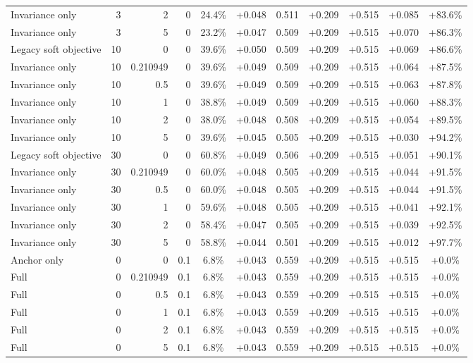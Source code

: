 \begin{table}[htbp]
\begin{tabular}{lrrrccccccc}
Invariance only & 3 & 2 & 0 & 24.4\% & +0.048 & 0.511 & +0.209 & +0.515 & +0.085 & +83.6\% \\
Invariance only & 3 & 5 & 0 & 23.2\% & +0.047 & 0.509 & +0.209 & +0.515 & +0.070 & +86.3\% \\
Legacy soft objective & 10 & 0 & 0 & 39.6\% & +0.050 & 0.509 & +0.209 & +0.515 & +0.069 & +86.6\% \\
Invariance only & 10 & 0.210949 & 0 & 39.6\% & +0.049 & 0.509 & +0.209 & +0.515 & +0.064 & +87.5\% \\
Invariance only & 10 & 0.5 & 0 & 39.6\% & +0.049 & 0.509 & +0.209 & +0.515 & +0.063 & +87.8\% \\
Invariance only & 10 & 1 & 0 & 38.8\% & +0.049 & 0.509 & +0.209 & +0.515 & +0.060 & +88.3\% \\
Invariance only & 10 & 2 & 0 & 38.0\% & +0.048 & 0.508 & +0.209 & +0.515 & +0.054 & +89.5\% \\
Invariance only & 10 & 5 & 0 & 39.6\% & +0.045 & 0.505 & +0.209 & +0.515 & +0.030 & +94.2\% \\
Legacy soft objective & 30 & 0 & 0 & 60.8\% & +0.049 & 0.506 & +0.209 & +0.515 & +0.051 & +90.1\% \\
Invariance only & 30 & 0.210949 & 0 & 60.0\% & +0.048 & 0.505 & +0.209 & +0.515 & +0.044 & +91.5\% \\
Invariance only & 30 & 0.5 & 0 & 60.0\% & +0.048 & 0.505 & +0.209 & +0.515 & +0.044 & +91.5\% \\
Invariance only & 30 & 1 & 0 & 59.6\% & +0.048 & 0.505 & +0.209 & +0.515 & +0.041 & +92.1\% \\
Invariance only & 30 & 2 & 0 & 58.4\% & +0.047 & 0.505 & +0.209 & +0.515 & +0.039 & +92.5\% \\
Invariance only & 30 & 5 & 0 & 58.8\% & +0.044 & 0.501 & +0.209 & +0.515 & +0.012 & +97.7\% \\
Anchor only & 0 & 0 & 0.1 & 6.8\% & +0.043 & 0.559 & +0.209 & +0.515 & +0.515 & +0.0\% \\
Full & 0 & 0.210949 & 0.1 & 6.8\% & +0.043 & 0.559 & +0.209 & +0.515 & +0.515 & +0.0\% \\
Full & 0 & 0.5 & 0.1 & 6.8\% & +0.043 & 0.559 & +0.209 & +0.515 & +0.515 & +0.0\% \\
Full & 0 & 1 & 0.1 & 6.8\% & +0.043 & 0.559 & +0.209 & +0.515 & +0.515 & +0.0\% \\
Full & 0 & 2 & 0.1 & 6.8\% & +0.043 & 0.559 & +0.209 & +0.515 & +0.515 & +0.0\% \\
Full & 0 & 5 & 0.1 & 6.8\% & +0.043 & 0.559 & +0.209 & +0.515 & +0.515 & +0.0\% \\

\end{tabular}
\end{table}

